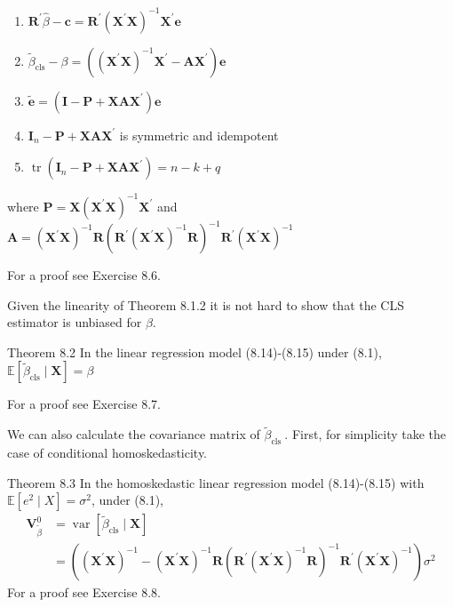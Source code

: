 \documentclass[10pt]{article}
\begin{document}
\begin{enumerate}
  \item $\boldsymbol{R}^{\prime} \widehat{\beta}-\boldsymbol{c}=\boldsymbol{R}^{\prime}\left(\boldsymbol{X}^{\prime} \boldsymbol{X}\right)^{-1} \boldsymbol{X}^{\prime} \boldsymbol{e}$

  \item $\widetilde{\beta}_{\mathrm{cls}}-\beta=\left(\left(\boldsymbol{X}^{\prime} \boldsymbol{X}\right)^{-1} \boldsymbol{X}^{\prime}-\boldsymbol{A} \boldsymbol{X}^{\prime}\right) \boldsymbol{e}$

  \item $\widetilde{\boldsymbol{e}}=\left(\boldsymbol{I}-\boldsymbol{P}+\boldsymbol{X} \boldsymbol{A} \boldsymbol{X}^{\prime}\right) \boldsymbol{e}$

  \item $\boldsymbol{I}_{n}-\boldsymbol{P}+\boldsymbol{X} \boldsymbol{A} \boldsymbol{X}^{\prime}$ is symmetric and idempotent

  \item $\operatorname{tr}\left(\boldsymbol{I}_{n}-\boldsymbol{P}+\boldsymbol{X} \boldsymbol{A} \boldsymbol{X}^{\prime}\right)=n-k+q$

\end{enumerate}
where $\boldsymbol{P}=\boldsymbol{X}\left(\boldsymbol{X}^{\prime} \boldsymbol{X}\right)^{-1} \boldsymbol{X}^{\prime}$ and $\boldsymbol{A}=\left(\boldsymbol{X}^{\prime} \boldsymbol{X}\right)^{-1} \boldsymbol{R}\left(\boldsymbol{R}^{\prime}\left(\boldsymbol{X}^{\prime} \boldsymbol{X}\right)^{-1} \boldsymbol{R}\right)^{-1} \boldsymbol{R}^{\prime}\left(\boldsymbol{X}^{\prime} \boldsymbol{X}\right)^{-1}$

For a proof see Exercise 8.6.

Given the linearity of Theorem 8.1.2 it is not hard to show that the CLS estimator is unbiased for $\beta$.

Theorem 8.2 In the linear regression model (8.14)-(8.15) under (8.1), $\mathbb{E}\left[\widetilde{\beta}_{\mathrm{cls}} \mid \boldsymbol{X}\right]=\beta$

For a proof see Exercise 8.7.

We can also calculate the covariance matrix of $\widetilde{\beta}_{\text {cls }}$. First, for simplicity take the case of conditional homoskedasticity.

Theorem 8.3 In the homoskedastic linear regression model (8.14)-(8.15) with $\mathbb{E}\left[e^{2} \mid X\right]=\sigma^{2}$, under (8.1),
$$
\begin{aligned}
\boldsymbol{V}_{\widetilde{\beta}}^{0} &=\operatorname{var}\left[\widetilde{\beta}_{\mathrm{cls}} \mid \boldsymbol{X}\right] \\
&=\left(\left(\boldsymbol{X}^{\prime} \boldsymbol{X}\right)^{-1}-\left(\boldsymbol{X}^{\prime} \boldsymbol{X}\right)^{-1} \boldsymbol{R}\left(\boldsymbol{R}^{\prime}\left(\boldsymbol{X}^{\prime} \boldsymbol{X}\right)^{-1} \boldsymbol{R}\right)^{-1} \boldsymbol{R}^{\prime}\left(\boldsymbol{X}^{\prime} \boldsymbol{X}\right)^{-1}\right) \sigma^{2}
\end{aligned}
$$
For a proof see Exercise 8.8.
\end{document}
